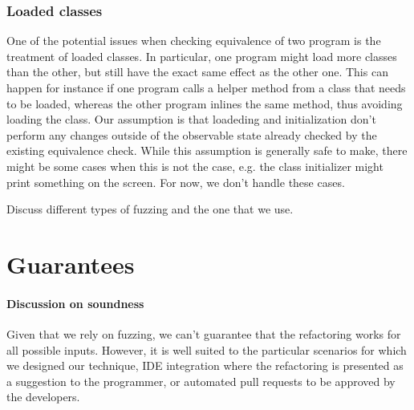 \documentclass[runningheads,a4paper]{llncs}
\begin{document}







\subsubsection{Loaded classes}

One of the potential issues when checking equivalence of two program
is the treatment of loaded classes. In particular, one program might
load more classes than the other, but still have the exact same effect
as the other one. This can happen for instance if one program calls a
helper method from a class that needs to be loaded, whereas the other
program inlines the same method, thus avoiding loading the class.  Our
assumption is that loadeding and initialization don't perform any
changes outside of the observable state already checked by the
existing equivalence check.  While this assumption is generally safe
to make, there might be some cases when this is not the case, e.g. the
class initializer might print something on the screen. For now, we
don't handle these cases.





Discuss different types of fuzzing and the one that we use.




\section{Guarantees}

\paragraph{Discussion on soundness} Given that we rely on fuzzing, we can't guarantee that the
refactoring works for all possible inputs. However, it is well suited
to the particular scenarios for which we designed our technique,
IDE integration where the refactoring is presented as a suggestion to the programmer,
or automated pull requests to be approved by the developers.
\end{document}

